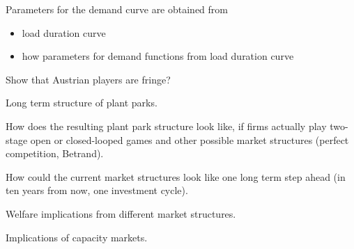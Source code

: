 Parameters for the demand curve are obtained from

\begin{itemize}
\item load duration curve
\item how parameters for demand functions from load duration curve
\end{itemize}

Show that Austrian players are fringe? 

Long term structure of plant parks.

How does the resulting plant park structure look like, if firms actually play two-stage open or closed-looped games and other possible market structures (perfect competition, Betrand). 

How could the current market structures look like one long term step ahead (in ten years from now, one investment cycle).

Welfare implications from different market structures.

Implications of capacity markets.

